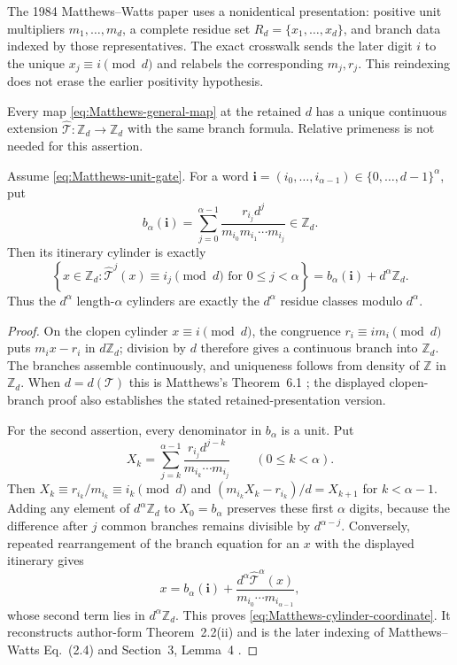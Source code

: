 The 1984 Matthews--Watts paper uses a nonidentical presentation: positive
unit multipliers $m_1,\ldots,m_d$, a complete residue set
$R_d=\{x_1,\ldots,x_d\}$, and branch data indexed by those representatives.
The exact crosswalk sends the later digit $i$ to the unique $x_j\equiv i\pmod
d$ and relabels the corresponding $m_j,r_j$.  This reindexing does not erase
the earlier positivity hypothesis.

\begin{proposition}
\label{prop:matthews-extension-cylinders}
Every map \eqref{eq:Matthews-general-map} at the retained $d$ has a unique
continuous extension
$\widehat{\mathcal T}:\mathbb Z_d\to\mathbb Z_d$ with the same branch formula.
Relative primeness is not needed for this assertion.

Assume \eqref{eq:Matthews-unit-gate}.  For a word
$\mathbf i=(i_0,\ldots,i_{\alpha-1})\in\{0,\ldots,d-1\}^{\alpha}$, put
\[
 b_{\alpha}(\mathbf i)=
 \sum_{j=0}^{\alpha-1}
 \frac{r_{i_j}d^j}{m_{i_0}m_{i_1}\cdots m_{i_j}}
 \in\mathbb Z_d.
\]
Then its itinerary cylinder is exactly
\begin{equation}
\label{eq:Matthews-cylinder-coordinate}
 \left\{x\in\mathbb Z_d:
 \widehat{\mathcal T}^{j}(x)\equiv i_j\pmod d
 \text{ for }0\leq j<\alpha\right\}
 =b_{\alpha}(\mathbf i)+d^{\alpha}\mathbb Z_d.
\end{equation}
Thus the $d^{\alpha}$ length-$\alpha$ cylinders are exactly the
$d^{\alpha}$ residue classes modulo $d^{\alpha}$.
\end{proposition}

\begin{proof}
On the clopen cylinder $x\equiv i\pmod d$, the congruence
$r_i\equiv i m_i\pmod d$ puts $m_ix-r_i$ in $d\mathbb Z_d$; division by $d$
therefore gives a continuous branch into $\mathbb Z_d$.  The branches assemble
continuously, and uniqueness follows from density of $\mathbb Z$ in
$\mathbb Z_d$.  When $d=d(\mathcal T)$ this is Matthews's Theorem~6.1
\cite[author-form p.~12]{Matthews2010AuthorForm}; the displayed clopen-branch
proof also establishes the stated retained-presentation version.

For the second assertion, every denominator in $b_{\alpha}$ is a unit.  Put
\[
 X_k=\sum_{j=k}^{\alpha-1}
 \frac{r_{i_j}d^{j-k}}{m_{i_k}\cdots m_{i_j}}
 \qquad(0\leq k<\alpha).
\]
Then $X_k\equiv r_{i_k}/m_{i_k}\equiv i_k\pmod d$ and
$(m_{i_k}X_k-r_{i_k})/d=X_{k+1}$ for $k<\alpha-1$.  Adding any element of
$d^{\alpha}\mathbb Z_d$ to $X_0=b_{\alpha}$ preserves these first $\alpha$
digits, because the difference after $j$ common branches remains divisible by
$d^{\alpha-j}$.  Conversely, repeated rearrangement of the branch equation for
an $x$ with the displayed itinerary gives
\[
 x=b_{\alpha}(\mathbf i)
 +\frac{d^{\alpha}\widehat{\mathcal T}^{\alpha}(x)}
 {m_{i_0}\cdots m_{i_{\alpha-1}}},
\]
whose second term lies in $d^{\alpha}\mathbb Z_d$.  This proves
\eqref{eq:Matthews-cylinder-coordinate}.  It reconstructs author-form
Theorem~2.2(ii) and is the later indexing of Matthews--Watts Eq.~(2.4) and
Section~3, Lemma~4
\cite[author-form p.~4]{Matthews2010AuthorForm}
\cite[pp.~169, 172--173]{MatthewsWatts1984}.
\end{proof}

